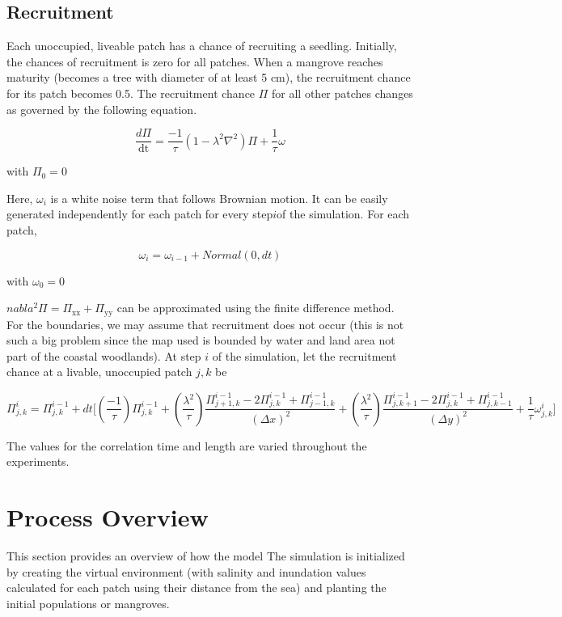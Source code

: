 \subsection{Recruitment}

Each unoccupied, liveable patch has a chance of recruiting a seedling.
Initially, the chances of recruitment is zero for all patches. When a
mangrove reaches maturity (becomes a tree with diameter of at least 5
cm), the recruitment chance for its patch becomes 0.5. The recruitment
chance \(\Pi\) for all other patches changes as governed by the following
equation.

$$\frac{d\Pi}{\text{dt}} = \frac{-1}{\tau}(1 - \lambda^{2}\nabla^{2})\Pi + \frac{1}{\tau}\omega$$

with $\Pi_{0} = 0$

Here, $\omega_{i}$ is a white noise term that follows Brownian motion.
It can be easily generated independently for each patch for every
step\(i\)of the simulation. For each patch,

$$\omega_{i} = \omega_{i - 1} + Normal(0,dt)$$

with $\omega_{0} = 0$


$nabla^{2}\Pi = \Pi_{\text{xx}} + \Pi_{\text{yy}}$ can be approximated
using the finite difference method. For the boundaries, we may assume
that recruitment does not occur (this is not such a big problem since
the map used is bounded by water and land area not part of the coastal
woodlands). At step \(i\) of the simulation, let the recruitment chance
at a livable, unoccupied patch \(j,k\) be

\begin{dmath}
\Pi_{j,k}^{i} = \Pi_{j,k}^{i - 1} + dt\lbrack(\frac{- 1}{\tau})\Pi_{j,k}^{i - 1} + (\frac{\lambda^{2}}{\tau})\frac{\Pi_{j + 1,k}^{i - 1} - 2\Pi_{j,k}^{i - 1} + \Pi_{j - 1,k}^{i - 1}}{{(\Delta x)}^{2}} + (\frac{\lambda^{2}}{\tau})\frac{\Pi_{j,k + 1}^{i - 1} - 2\Pi_{j,k}^{i - 1} + \Pi_{j,k - 1}^{i - 1}}{{(\Delta y)}^{2}} + \frac{1}{\tau}\omega_{j,k}^{i}\rbrack
\end{dmath}

The values for the correlation time and length are varied throughout the
experiments.

\section{Process Overview}

This section provides an overview of how the model 
The simulation is initialized by creating the virtual environment (with
salinity and inundation values calculated for each patch using their
distance from the sea) and planting the initial populations or
mangroves.

